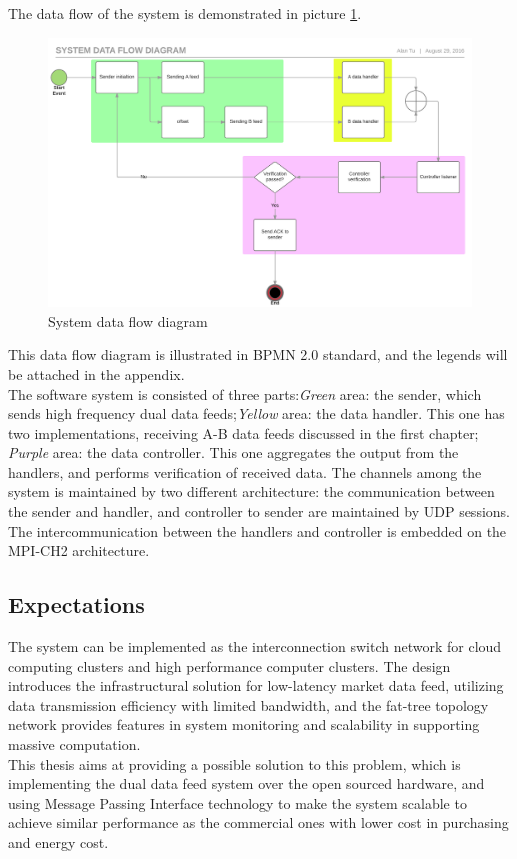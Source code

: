 \documentclass[11pt,openright,a4paper]{report}
\begin{document}
The data flow of the system is demonstrated in picture \ref{fig:Systemdataflowdiagram-Page1}.
\begin{figure}[H]
\centering
\includegraphics[width=1.0\linewidth]{"picture/System data flow diagram - Page 1"}
\caption{System data flow diagram}
\label{fig:Systemdataflowdiagram-Page1}
\end{figure}
This data flow diagram is illustrated in BPMN 2.0 standard, and the legends will be attached in the appendix.\\
The software system is consisted of three parts:\textit{Green} area: the sender, which sends high frequency dual data feeds;\textit{Yellow} area: the data handler. This one has two implementations, receiving A-B data feeds discussed in the first chapter; \textit{Purple} area: the data controller. This one aggregates the output from the handlers, and performs verification of received data. The channels among the system is maintained by two different architecture: the communication between the sender and handler, and controller to sender are maintained by UDP sessions. The intercommunication between the handlers and controller is embedded on the MPI-CH2 architecture.\\
\subsection{Expectations}
The system can be implemented as the interconnection switch network for cloud computing clusters and high performance computer clusters. The design introduces the infrastructural solution for low-latency market data feed, utilizing data transmission efficiency with limited bandwidth, and the fat-tree topology network provides features in system monitoring and scalability in supporting massive computation.\\  
This thesis aims at providing a possible solution to this problem, which is implementing the dual data feed system over the open sourced hardware, and using Message Passing Interface technology to make the system scalable to achieve similar performance as the commercial ones with lower cost in purchasing and energy cost.\\
\end{document}
